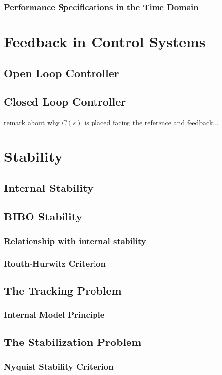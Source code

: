 \documentclass[10pt]{article}
\begin{document}
\subsubsection{Performance Specifications in the Time Domain}

\section{Feedback in Control Systems}
\subsection{Open Loop Controller}
\subsection{Closed Loop Controller}
remark about why $C(s)$ is placed facing the reference and feedback...

\section{Stability}
\subsection{Internal Stability}
\subsection{BIBO Stability}
\subsubsection{Relationship with internal stability}

\subsubsection{Routh-Hurwitz Criterion}
\subsection{The Tracking Problem}
\subsubsection{Internal Model Principle}
\subsection{The Stabilization Problem}
\subsubsection{Nyquist Stability Criterion}
\end{document}
